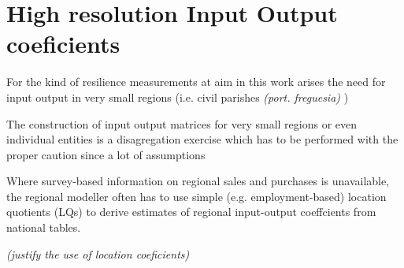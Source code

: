 
\section{High resolution Input Output coeficients}

For the kind of resilience measurements at aim in this work arises the need for
input output in very small regions (i.e. civil parishes \textit{(port. freguesia)} ) 

The construction of input output matrices for very small regions or even
individual entities is a disagregation exercise which has to be performed with
the proper caution since a lot of assumptions 

Where survey-based information on regional sales and purchases is unavailable,
the regional modeller often has to use simple (e.g. employment-based) location
quotients (LQs) to derive estimates of regional input-output coeffcients from national
tables.

\medskip

\emph{(justify the use of location coeficients)}


 

